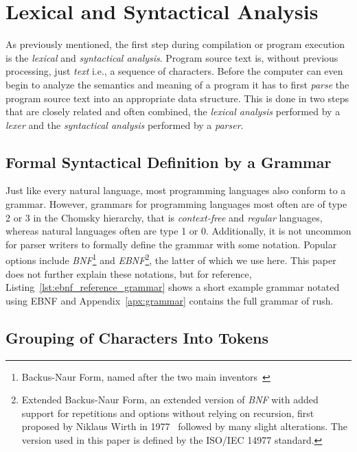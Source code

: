 \section{Lexical and Syntactical Analysis}

As previously mentioned, the first step during compilation or program execution is the \emph{lexical} and \emph{syntactical analysis}.
Program source text is, without previous processing, just \emph{text} i.e., a sequence of characters.
Before the computer can even begin to analyze the semantics and meaning of a program it has to first \emph{parse} the program source text into an appropriate data structure.
This is done in two steps that are closely related and often combined, the \emph{lexical analysis} performed by a \emph{lexer} and the \emph{syntactical analysis} performed by a \emph{parser}.

\subsection{Formal Syntactical Definition by a Grammar}

Just like every natural language, most programming languages also conform to a grammar.
However, grammars for programming languages most often are of type 2 or 3 in the Chomsky hierarchy, that is \emph{context-free} and \emph{regular} languages, whereas natural languages often are type 1 or 0.
Additionally, it is not uncommon for parser writers to formally define the grammar with some notation.
Popular options include \emph{BNF}\footnote{Backus-Naur Form, named after the two main inventors~\cite{Backus1960}} and \emph{EBNF}\footnote{Extended Backus-Naur Form, an extended version of \emph{BNF} with added support for repetitions and options without relying on recursion, first proposed by Niklaus Wirth in 1977~\cite{Wirth1977} followed by many slight alterations. The version used in this paper is defined by the ISO/IEC 14977 standard.},  the latter of which we use here.
This paper does not further explain these notations, but for reference, Listing~\ref{lst:ebnf_reference_grammar} shows a short example grammar notated using EBNF and Appendix~\ref{apx:grammar} contains the full grammar of rush.


\subsection{Grouping of Characters Into Tokens}


